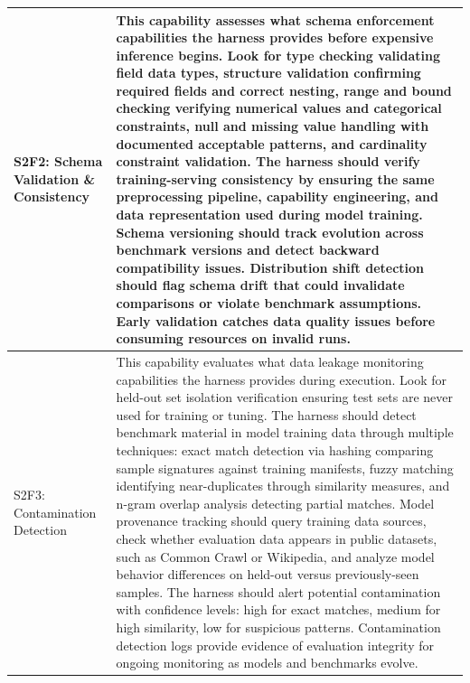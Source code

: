 \begin{longtable}{>{\raggedright\arraybackslash}p{3cm}|>{\raggedright\arraybackslash}p{16cm}}
S2F2: Schema Validation \& Consistency & This capability assesses what schema enforcement capabilities the harness provides before expensive inference begins. Look for type checking validating field data types, structure validation confirming required fields and correct nesting, range and bound checking verifying numerical values and categorical constraints, null and missing value handling with documented acceptable patterns, and cardinality constraint validation. The harness should verify training-serving consistency by ensuring the same preprocessing pipeline, capability engineering, and data representation used during model training. Schema versioning should track evolution across benchmark versions and detect backward compatibility issues. Distribution shift detection should flag schema drift that could invalidate comparisons or violate benchmark assumptions. Early validation catches data quality issues before consuming resources on invalid runs. \\
\hline

S2F3: Contamination Detection & This capability evaluates what data leakage monitoring capabilities the harness provides during execution. Look for held-out set isolation verification ensuring test sets are never used for training or tuning. The harness should detect benchmark material in model training data through multiple techniques: exact match detection via hashing comparing sample signatures against training manifests, fuzzy matching identifying near-duplicates through similarity measures, and n-gram overlap analysis detecting partial matches. Model provenance tracking should query training data sources, check whether evaluation data appears in public datasets, such as Common Crawl or Wikipedia, and analyze model behavior differences on held-out versus previously-seen samples. The harness should alert potential contamination with confidence levels: high for exact matches, medium for high similarity, low for suspicious patterns. Contamination detection logs provide evidence of evaluation integrity for ongoing monitoring as models and benchmarks evolve. \\
\hline


\end{longtable}
